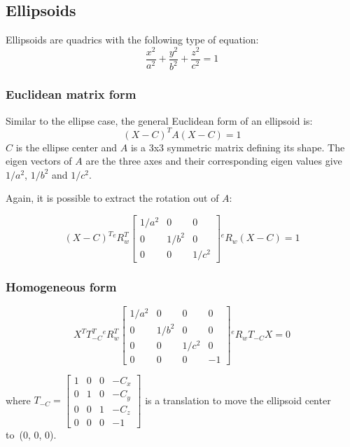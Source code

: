 \subsection{Ellipsoids}

Ellipsoids are quadrics with the following type of equation:
\begin{equation}
    \frac{x^2}{a^2} + \frac{y^2}{b^2} + \frac{z^2}{c^2} = 1
\end{equation}


\subsubsection{Euclidean matrix form}
Similar to the ellipse case, the general Euclidean form of an ellipsoid is:
\begin{equation}
    (X - C)^T A (X - C) = 1
\end{equation}
$C$ is the ellipse center and $A$ is a 3x3 symmetric matrix defining its shape. The eigen vectors of $A$ are the three axes and their corresponding eigen values give $1/a^2$, $1/b^2$ and $1/c^2$.

Again, it is possible to extract the rotation out of $A$:

\begin{equation}
(X - C)^T {}^{e}R_{w}^T \left[ \begin{array}{ccc}
    1/a^2 & 0 & 0 \\
    0 & 1/b^2 & 0 \\
    0 & 0 & 1/c^2
\end{array}
\right] {}^{e}R_{w} (X - C) = 1
\end{equation}


\subsubsection{Homogeneous form}
\begin{equation}
    X^T T_{-C}^T
    {}^{e}R_{w}^T
    \left[ \begin{array}{cccc}
    1/a^2 & 0 & 0 & 0\\
    0 & 1/b^2 & 0 & 0\\
    0 & 0 & 1/c^2 & 0\\
    0 & 0 & 0 & -1
    \end{array}\right]
    {}^{e}R_{w}
    T_{-C}
    X = 0
\end{equation}

where $T_{-C} = \left[\begin{array}{cccc}
    1&0&0&-C_x \\
    0&1&0&-C_y \\
    0&0&1&-C_z \\
    0&0&0&-1
    \end{array}\right]$ is a translation to move the ellipsoid center to~(0, 0, 0).

